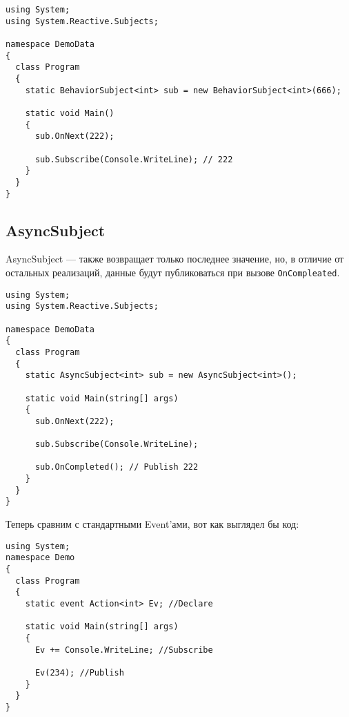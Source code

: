 \begin{lstlisting}[style=csharpinlinestyle, caption={Пример использования BehaviorSubject}, label=lst:practice:reactive_extensions:behavior_subject_example]
using System;
using System.Reactive.Subjects;

namespace DemoData
{
  class Program
  {
    static BehaviorSubject<int> sub = new BehaviorSubject<int>(666);

    static void Main()
    {
      sub.OnNext(222);

      sub.Subscribe(Console.WriteLine); // 222
    }
  }
}
\end{lstlisting}

\subsection{AsyncSubject}
\label{subsub:practice:reactive_extensions:async_subject}

AsyncSubject --- также возвращает только последнее значение, но, в отличие от остальных реализаций, данные будут публиковаться при вызове \lstinline[style=csharpinlinestyle]!OnCompleated!.

\begin{lstlisting}[style=csharpinlinestyle, caption={Пример использования AsyncSubject}, label=lst:practice:reactive_extensions:async_subject_example]
using System;
using System.Reactive.Subjects;

namespace DemoData
{
  class Program
  {
    static AsyncSubject<int> sub = new AsyncSubject<int>();

    static void Main(string[] args)
    {
      sub.OnNext(222);

      sub.Subscribe(Console.WriteLine);

      sub.OnCompleted(); // Publish 222
    }
  }
}
\end{lstlisting}

Теперь сравним с стандартными Event’ами, вот как выглядел бы код:

\begin{lstlisting}[style=csharpinlinestyle, caption={Стандартная модель Event}, label=lst:practice:reactive_extensions:event_example]
using System;
namespace Demo
{
  class Program
  {
    static event Action<int> Ev; //Declare

    static void Main(string[] args)
    {
      Ev += Console.WriteLine; //Subscribe

      Ev(234); //Publish
    }
  }
}
\end{lstlisting}

